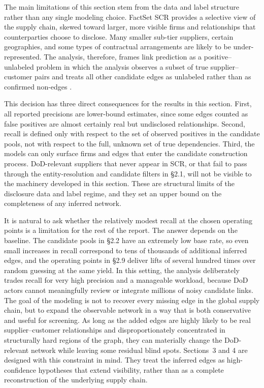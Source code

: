 The main limitations of this section stem from the data and label structure rather than any single modeling choice. FactSet SCR provides a selective view of the supply chain, skewed toward larger, more visible firms and relationships that counterparties choose to disclose. Many smaller sub-tier suppliers, certain geographies, and some types of contractual arrangements are likely to be under-represented. The analysis, therefore, frames link prediction as a positive--unlabeled problem in which the analysis observes a subset of true supplier--customer pairs and treats all other candidate edges as unlabeled rather than as confirmed non-edges \parencite{elkan_learning_2008,du_plessis_analysis_2014}.

This decision has three direct consequences for the results in this section. First, all reported precisions are lower-bound estimates, since some edges counted as false positives are almost certainly real but undisclosed relationships. Second, recall is defined only with respect to the set of observed positives in the candidate pools, not with respect to the full, unknown set of true dependencies. Third, the models can only surface firms and edges that enter the candidate construction process. DoD-relevant suppliers that never appear in SCR, or that fail to pass through the entity-resolution and candidate filters in \S2.1, will not be visible to the machinery developed in this section. These are structural limits of the disclosure data and label regime, and they set an upper bound on the completeness of any inferred network.

It is natural to ask whether the relatively modest recall at the chosen operating points is a limitation for the rest of the report. The answer depends on the baseline. The candidate pools in \S2.2 have an extremely low base rate, so even small increases in recall correspond to tens of thousands of additional inferred edges, and the operating points in \S2.9 deliver lifts of several hundred times over random guessing at the same yield. In this setting, the analysis deliberately trades recall for very high precision and a manageable workload, because DoD actors cannot meaningfully review or integrate millions of noisy candidate links. The goal of the modeling is not to recover every missing edge in the global supply chain, but to expand the observable network in a way that is both conservative and useful for screening. As long as the added edges are highly likely to be real supplier--customer relationships and disproportionately concentrated in structurally hard regions of the graph, they can materially change the DoD-relevant network while leaving some residual blind spots. Sections~3 and 4 are designed with this constraint in mind. They treat the inferred edges as high-confidence hypotheses that extend visibility, rather than as a complete reconstruction of the underlying supply chain.

